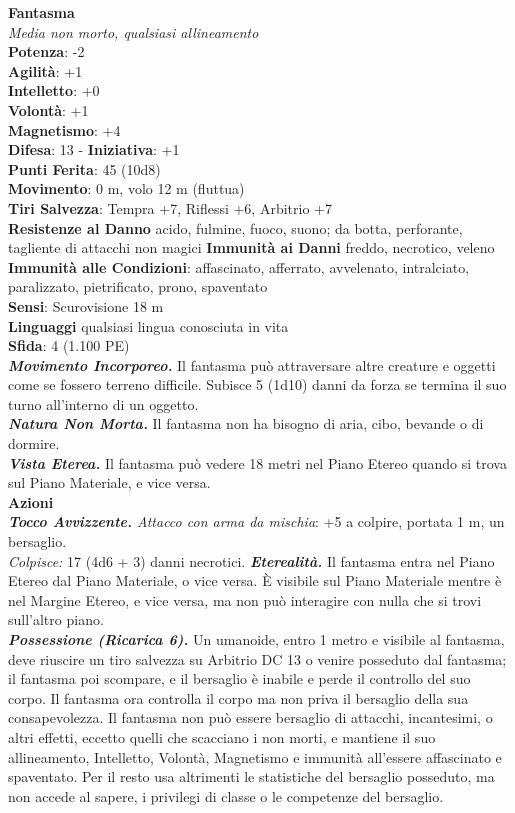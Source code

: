 \begin{multicols}{2}
\medskip\textbf{Fantasma}\\
\emph{Media non morto, qualsiasi allineamento}\\
\textbf{Potenza}: -2\\
\textbf{Agilità}: +1\\
\textbf{Intelletto}: +0\\
\textbf{Volontà}: +1\\
\textbf{Magnetismo}: +4\\
\textbf{Difesa}: 13 - \textbf{Iniziativa}: +1\\
\textbf{Punti Ferita}: 45 (10d8)\\
\textbf{Movimento}: 0 m, volo 12 m (fluttua)\\
\textbf{Tiri Salvezza}: Tempra +7, Riflessi +6, Arbitrio +7\\
\textbf{Resistenze al Danno} acido, fulmine, fuoco, suono; da botta, perforante, tagliente di attacchi non magici
\textbf{Immunità ai Danni} freddo, necrotico, veleno\\
\textbf{Immunità alle Condizioni}: affascinato, afferrato, avvelenato, intralciato, paralizzato, pietrificato, prono, spaventato \\
\textbf{Sensi}: Scurovisione 18 m\\
\textbf{Linguaggi} qualsiasi lingua conosciuta in vita\\
\textbf{Sfida}: 4 (1.100 PE)\smallskip\\
\emph{\textbf{Movimento Incorporeo.}} Il fantasma può attraversare altre creature e oggetti come se fossero terreno difficile. Subisce 5 (1d10) danni da forza se termina il suo turno all'interno di un oggetto.\\
\emph{\textbf{Natura Non Morta.}} Il fantasma non ha bisogno di aria, cibo, bevande o di dormire.\\
\emph{\textbf{Vista Eterea.}} Il fantasma può vedere 18 metri nel Piano  Etereo quando si trova sul Piano Materiale, e vice versa.\\
\smallskip\textbf{Azioni}\\
\emph{\textbf{Tocco Avvizzente.} Attacco con arma da mischia}: +5 a colpire, portata 1 m, un bersaglio.\\
\emph{Colpisce:} 17 (4d6 + 3) danni necrotici. 
\emph{\textbf{Eterealità.}} Il fantasma entra nel Piano Etereo dal Piano Materiale, o vice versa. È visibile sul Piano Materiale mentre è nel Margine Etereo, e vice versa, ma non può interagire con nulla che si trovi sull'altro piano.\\
\emph{\textbf{Possessione (Ricarica 6).}} Un umanoide, entro 1 metro e visibile al fantasma, deve riuscire un tiro salvezza su Arbitrio DC 13 o venire posseduto dal fantasma; il fantasma poi scompare, e il bersaglio è inabile e perde il controllo del suo corpo. Il fantasma ora controlla il corpo ma non priva il bersaglio della sua consapevolezza. Il fantasma non può essere bersaglio di attacchi, incantesimi, o altri effetti, eccetto quelli che scacciano i non morti, e mantiene il suo allineamento, Intelletto, Volontà, Magnetismo e immunità all'essere affascinato e spaventato. Per il resto usa altrimenti le statistiche del bersaglio posseduto, ma non accede al sapere, i privilegi di classe o le competenze del bersaglio.\\

\end{multicols}
